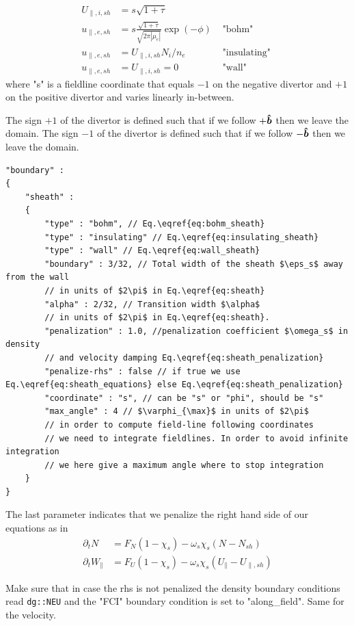 \begin{align}
    U_{\parallel,i, sh} &= s\sqrt{1+\tau} \\
    u_{\parallel,e, sh} &= s\frac{\sqrt{1+\tau}}{\sqrt{2\pi|\mu_e|}}\exp(-\phi) &\text{ "bohm" } \label{eq:bohm_sheath}\\
    u_{\parallel,e, sh} &= U_{\parallel,i,sh}N_i/n_e &\text{ "insulating" } \label{eq:insulating_sheath} \\
    u_{\parallel,e, sh} &= U_{\parallel,i,sh} = 0 &\text{ "wall" } \label{eq:wall_sheath}
\end{align}
where "s" is a fieldline coordinate that equals $-1$ on the negative divertor and $+1$ on the positive divertor
and varies linearly in-between.
\begin{tcolorbox}[title=Note]
    The sign $+1$ of the divertor is defined such that if we follow $+\bm{\hat{b}}$
    then we leave the domain.
    The sign $-1$ of the divertor is defined such that if we follow $-\bm{\hat{b}}$
    then we leave the domain.
\end{tcolorbox}
\begin{verbatim}
"boundary" :
{
    "sheath" :
    {
        "type" : "bohm", // Eq.\eqref{eq:bohm_sheath}
        "type" : "insulating" // Eq.\eqref{eq:insulating_sheath}
        "type" : "wall" // Eq.\eqref{eq:wall_sheath}
        "boundary" : 3/32, // Total width of the sheath $\eps_s$ away from the wall
        // in units of $2\pi$ in Eq.\eqref{eq:sheath}
        "alpha" : 2/32, // Transition width $\alpha$
        // in units of $2\pi$ in Eq.\eqref{eq:sheath}.
        "penalization" : 1.0, //penalization coefficient $\omega_s$ in density
        // and velocity damping Eq.\eqref{eq:sheath_penalization}
        "penalize-rhs" : false // if true we use Eq.\eqref{eq:sheath_equations} else Eq.\eqref{eq:sheath_penalization}
        "coordinate" : "s", // can be "s" or "phi", should be "s"
        "max_angle" : 4 // $\varphi_{\max}$ in units of $2\pi$
        // in order to compute field-line following coordinates
        // we need to integrate fieldlines. In order to avoid infinite integration
        // we here give a maximum angle where to stop integration
    }
}
\end{verbatim}
\noindent
The last parameter indicates that we penalize the right hand side of our equations
as in
\begin{subequations} \label{eq:sheath_equations}
\begin{align}
    \partial_t N &= F_N ( 1-\chi_s)  -\omega_s\chi_s (N-N_{sh})\\
    \partial_t W_\parallel &= F_U  ( 1 - \chi_s) -\omega_s\chi_s (U_\parallel-
        U_{\parallel,sh})
\end{align}
\end{subequations}
\begin{tcolorbox}[title=Note]
    Make sure that in case the rhs is not penalized the density boundary conditions
    read \texttt{dg::NEU} and the "FCI" boundary condition is set to "along\_field".
    Same for the velocity.
\end{tcolorbox}

